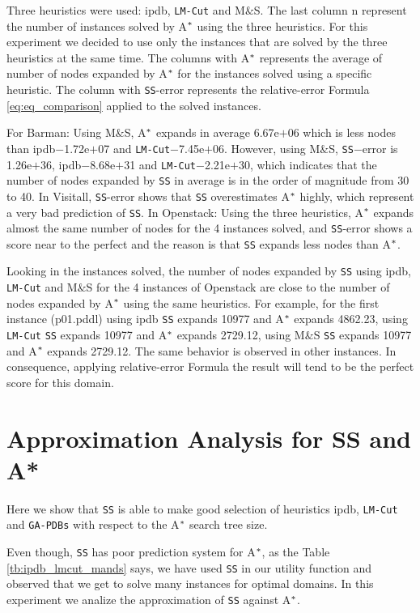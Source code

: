 Three heuristics were used: ipdb, \texttt{LM-Cut} and M$\&$S.  The last column \textsf{n} represent the number of instances solved by A$\sp{*}$ using the three heuristics. For this experiment we decided to use only the instances that are solved by the three heuristics at the same time. The columns with A$\sp{*}$ represents the average of number of nodes expanded by A$\sp{*}$ for the instances solved using a specific heuristic. The column with \texttt{SS}-error represents the relative-error Formula \ref{eq:eq_comparison} applied to the solved instances.

For Barman: Using M$\&$S, A$\sp{*}$ expands in average 6.67e$+$06 which is less nodes than ipdb$-$1.72e$+$07 and \texttt{LM-Cut}$-$7.45e$+$06. However, using M$\&$S, \texttt{SS}$-$error is 1.26e$+$36, ipdb$-$8.68e$+$31 and \texttt{LM-Cut}$-$2.21e$+$30, which indicates that the number of nodes expanded by \texttt{SS} in average is in the order of magnitude from 30 to 40. In Visitall, \texttt{SS}-error shows that \texttt{SS} overestimates A$\sp{*}$ highly, which represent a very bad prediction of \texttt{SS}. In Openstack: Using the three heuristics, A$\sp{*}$ expands almost the same number of nodes for the 4 instances solved, and \texttt{SS}-error shows a score near to the perfect and the reason is that \texttt{SS} expands less nodes than A$\sp{*}$. 

Looking in the instances solved, the number of nodes expanded by \texttt{SS} using ipdb, \texttt{LM-Cut} and M$\&$S for the 4 instances of Openstack are close to the number of nodes expanded by A$\sp{*}$ using the same heuristics. For example, for the first instance (p01.pddl) using ipdb \texttt{SS} expands 10977 and A$\sp{*}$ expands 4862.23, using \texttt{LM-Cut} \texttt{SS} expands 10977 and A$\sp{*}$ expands 2729.12, using M$\&$S \texttt{SS} expands 10977 and A$\sp{*}$ expands 2729.12. The same behavior is observed in other instances. In consequence, applying relative-error Formula the result will tend to be the perfect score for this domain.

\section{Approximation Analysis for SS and A*}
\noindent
Here we show that \texttt{SS} is able to make good selection of heuristics ipdb, \texttt{LM-Cut} and \texttt{GA-PDBs} with respect to the A$\sp{*}$ search tree size.

Even though, \texttt{SS} has poor prediction system for A$\sp{*}$, as the Table \ref{tb:ipdb_lmcut_mands} says, we have used \texttt{SS} in our utility function and observed that we get to solve many instances for optimal domains. In this experiment we analize the approximation of \texttt{SS} against A$\sp{*}$. 

